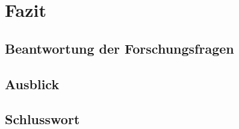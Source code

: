 
\chapter{Fazit}
\label{chap:fazit}

\section{Beantwortung der Forschungsfragen}
\label{sec:ff-beantwortung}

\section{Ausblick}
\label{sec:ausblick}

\section{Schlusswort}
\label{sec:schlusswort}
